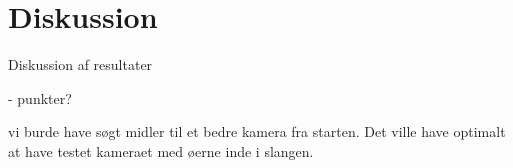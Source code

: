\chapter{Diskussion}
Diskussion af resultater

- punkter?

vi burde have søgt midler til et bedre kamera fra starten. Det ville have optimalt at have testet kameraet med øerne inde i slangen. 